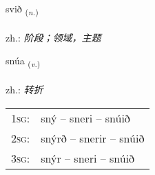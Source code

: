 \documentclass[frontgrid, backgrid]{flacards}\usepackage[]{graphicx}\usepackage[]{xcolor}
\begin{document}
\renewcommand{\blhead}{\vskip5pt {\small\bfseries\footnotesize Nafnorð | 名词 }}
\renewcommand{\bcfoot}{\vskip5pt \hspace{2pt}{\small\bfseries\footnotesize 1K}}


{svið \small{\textsubscript{(\textit{n.})}} \\[1ex] %
\textphonetic{[svɪːð]} \\
zh.: \emph{阶段；领域，主题} \\  [2ex]
\renewcommand*{\arraystretch}{0.8}
}

\renewcommand{\flhead}{\vskip5pt \fboxsep=0pt {\small\bfseries\footnotesize Sagnorð | 动词}}
\renewcommand{\fcfoot}{\vskip5pt \fboxsep=0pt \hspace{2pt}{\small\bfseries\footnotesize 1K}}

\renewcommand{\blhead}{\vskip5pt {\small\bfseries\footnotesize Sagnorð | 动词 }}
\renewcommand{\bcfoot}{\vskip5pt \hspace{2pt}{\small\bfseries\footnotesize 1K}}


{snúa \small{\textsubscript{(\textit{v.})}} \\[1ex] %
\textphonetic{[stnuːa]} \\
zh.: \emph{转折} \\  [2ex]
\renewcommand*{\arraystretch}{0.8}
\begin{tabular}{p{1cm}l}
\textsc{1sg}: & sný -- sneri -- snúið \\ 
\textsc{2sg}: & snýrð -- snerir -- snúið \\ 
\textsc{3sg}: & snýr -- sneri -- snúið \\ 
\end{tabular}
}

\renewcommand{\flhead}{\vskip5pt \fboxsep=0pt {\small\bfseries\footnotesize Nafnorð | 名词}}
\renewcommand{\fcfoot}{\vskip5pt \fboxsep=0pt \hspace{2pt}{\small\bfseries\footnotesize 1K}}
\end{document}
